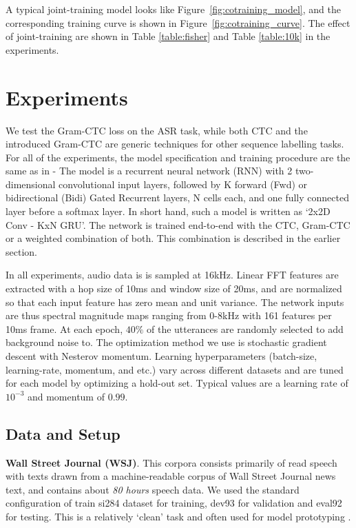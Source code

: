 \documentclass{article}
\begin{document}
A typical joint-training model looks like Figure~\ref{fig:cotraining_model}, and the corresponding training curve is shown in Figure~\ref{fig:cotraining_curve}.  The effect of joint-training are shown in Table \ref{table:fisher} and Table \ref{table:10k} in the experiments.


\section{Experiments}

We test the Gram-CTC loss on the ASR task, while both CTC and the introduced Gram-CTC are generic techniques for other sequence labelling tasks. For all of the experiments, the model specification and training procedure are the same as in \cite{amodei2015deep} - The model is a recurrent neural network (RNN) with 2 two-dimensional convolutional input layers, followed by K forward (Fwd) or bidirectional (Bidi) Gated Recurrent layers, N cells each, and one fully connected layer before a softmax layer. In short hand, such a model is written as `2x2D Conv - KxN GRU'. The network is trained end-to-end with the CTC, Gram-CTC or a weighted combination of both. This combination is described in the earlier section.

In all experiments, audio data is is sampled at 16kHz. Linear FFT features are extracted with a hop size of 10ms and window size of 20ms,  and are normalized so that each input feature has zero mean and unit variance. The network inputs are thus spectral magnitude maps ranging from 0-8kHz with 161 features per 10ms frame.  At each epoch, $40\%$ of the utterances are randomly selected to add background noise to. The optimization method we use is stochastic gradient descent with Nesterov momentum. Learning hyperparameters (batch-size, learning-rate, momentum, and etc.) vary across different datasets and are tuned for each model by optimizing a hold-out set. Typical values are a learning rate of $10^{-3}$ and momentum of $0.99$.



\subsection{Data and Setup}

{\bf Wall Street Journal (WSJ)}. This corpora consists primarily of read speech with texts drawn from a machine-readable corpus of Wall Street Journal news text, and contains about {\it 80 hours} speech data. We used the standard configuration of train si284 dataset for training, dev93 for validation and eval92 for testing. This is a relatively `clean' task and often used for model prototyping \cite{miao2015eesen, bahdanau2016end, zhang2016very, chan2016lsd}.
\end{document}
